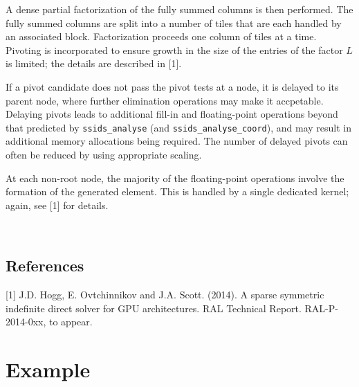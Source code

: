 \documentclass{spral}
\begin{document}
A dense partial factorization of the fully summed columns is then performed. The
fully summed columns are split into a number
of tiles that are each handled by an associated  block. Factorization
proceeds one column of tiles at a time. Pivoting is incorporated to ensure
growth in the size of the entries of the factor $L$
is limited; the details are described in [1].


If a pivot candidate does not pass the pivot tests at a node, it is delayed
to its parent node, where further elimination operations may make it accpetable.
Delaying pivots leads to additional fill-in and floating-point
operations beyond that predicted by {\tt ssids\_analyse}  (and {\tt ssids\_analyse\_coord}), 
and may result in additional memory allocations being required.
The number of delayed pivots can often be reduced by using appropriate scaling.

At each non-root node, the majority of the floating-point operations  involve the formation
of the generated element. 
This is handled by a single dedicated kernel; again, see [1] for details.

\vspace{0.2in}
\\


\subsection*{References}
[1] J.D. Hogg, E. Ovtchinnikov and J.A. Scott. (2014).
A sparse symmetric indefinite direct solver for GPU architectures.
RAL Technical Report. RAL-P-2014-0xx, to appear.




\section{Example} \label{examples}
\end{document}
